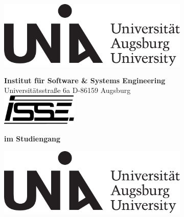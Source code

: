 \begin{titlepage}
\thispagestyle{empty}
\begin{center}
    \includegraphics[height=3.2cm]{fig/unilogo/Uni-Logo.pdf}
\end{center}

\vspace{8mm}
\begin{center}
{\Large
{\bfseries \bfseries Institut für Software \& Systems Engineering}\\
Universitätsstraße 6a \hspace{0.25cm} D-86159 Augsburg\\[5mm]
\includegraphics[height=1.5cm]{fig/unilogo/ISSE-Logo.pdf}
}
\end{center}

\vspace{1cm}
\begin{center}
{\large \textbf{\thesistype im Studiengang}\\[0.5ex]
\textbf{\glqq \studiengang\grqq}}
\end{center}
\vspace{1cm}

\begin{center}
{\Huge \bfseries \thetitle}
\end{center}

\vspace{1.5cm}
\begin{center}
{\LARGE \authorname}
\end{center}
\end{titlepage}




\newpage
\thispagestyle{empty}
\mbox{}
\newpage
\thispagestyle{empty}
\begin{center}
    \includegraphics[height=3.2cm]{fig/unilogo/Uni-Logo.pdf}
\end{center}

